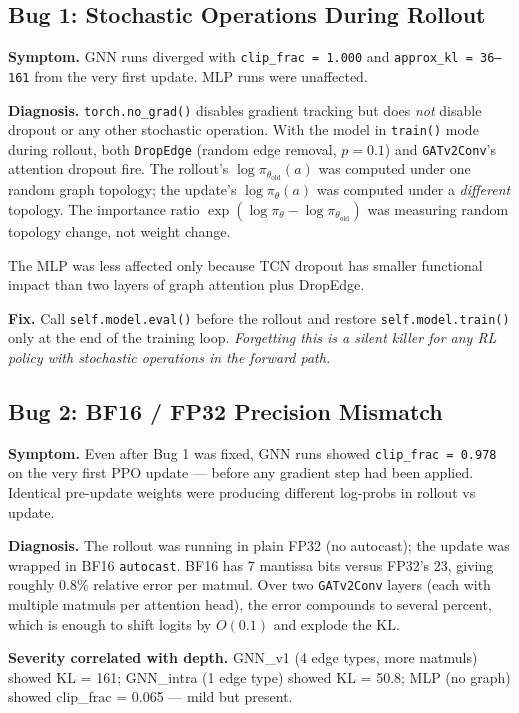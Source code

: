 \documentclass[11pt,a4paper]{article}
\begin{document}
\subsection{Bug 1: Stochastic Operations During Rollout}

\textbf{Symptom.} GNN runs diverged with \texttt{clip\_frac = 1.000} and
\texttt{approx\_kl = 36--161} from the very first update. MLP runs were unaffected.

\textbf{Diagnosis.} \texttt{torch.no\_grad()} disables gradient tracking but does
\emph{not} disable dropout or any other stochastic operation. With the model in
\texttt{train()} mode during rollout, both \texttt{DropEdge} (random edge removal,
$p = 0.1$) and \texttt{GATv2Conv}'s attention dropout fire. The rollout's
$\log \pi_{\theta_{\text{old}}}(a)$ was computed under one random graph topology; the
update's $\log \pi_\theta(a)$ was computed under a \emph{different} topology. The
importance ratio $\exp(\log \pi_\theta - \log \pi_{\theta_{\text{old}}})$ was measuring
random topology change, not weight change.

The MLP was less affected only because TCN dropout has smaller functional impact
than two layers of graph attention plus DropEdge.

\textbf{Fix.} Call \texttt{self.model.eval()} before the rollout and restore
\texttt{self.model.train()} only at the end of the training loop. \emph{Forgetting
this is a silent killer for any RL policy with stochastic operations in the
forward path.}

\subsection{Bug 2: BF16 / FP32 Precision Mismatch}

\textbf{Symptom.} Even after Bug 1 was fixed, GNN runs showed
\texttt{clip\_frac = 0.978} on the very first PPO update --- before any gradient
step had been applied. Identical pre-update weights were producing different
log-probs in rollout vs update.

\textbf{Diagnosis.} The rollout was running in plain FP32 (no autocast); the
update was wrapped in BF16 \texttt{autocast}. BF16 has 7 mantissa bits versus
FP32's 23, giving roughly $0.8\%$ relative error per matmul. Over two
\texttt{GATv2Conv} layers (each with multiple matmuls per attention head), the
error compounds to several percent, which is enough to shift logits by
$O(0.1)$ and explode the KL.

\textbf{Severity correlated with depth.} GNN\_v1 (4 edge types, more matmuls)
showed KL = 161; GNN\_intra (1 edge type) showed KL = 50.8; MLP (no graph)
showed clip\_frac = 0.065 --- mild but present.
\end{document}
